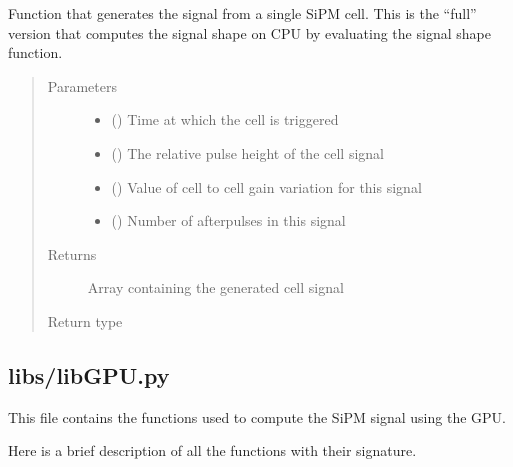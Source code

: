 \documentclass[letterpaper,10pt,english]{sphinxmanual}
\begin{document}
\begin{fulllineitems}
\label{\detokenize{structure:libs.libCPU.PulseCPU}}
Function that generates the signal from a single SiPM cell.
This is the “full” version that computes the signal shape on CPU by evaluating the signal shape function.
\begin{quote}\begin{description}
\item[{Parameters}] \leavevmode\begin{itemize}
\item {} 
 () \textendash{} Time at which the cell is triggered

\item {} 
 () \textendash{} The relative pulse height of the cell signal

\item {} 
 () \textendash{} Value of cell to cell gain variation for this signal

\item {} 
 () \textendash{} Number of afterpulses in this signal

\end{itemize}

\item[{Returns}] \leavevmode
{} \textendash{} Array containing the generated cell signal

\item[{Return type}] \leavevmode
{}

\end{description}\end{quote}

\end{fulllineitems}



\subsection{libs/libGPU.py}
\label{\detokenize{structure:libs-libgpu-py}}
\begin{DUlineblock}{0em}
\item[] This file contains the functions used to compute the SiPM signal using the GPU.
\item[] Here is a brief description of all the functions with their signature.
\end{DUlineblock}
\end{document}
